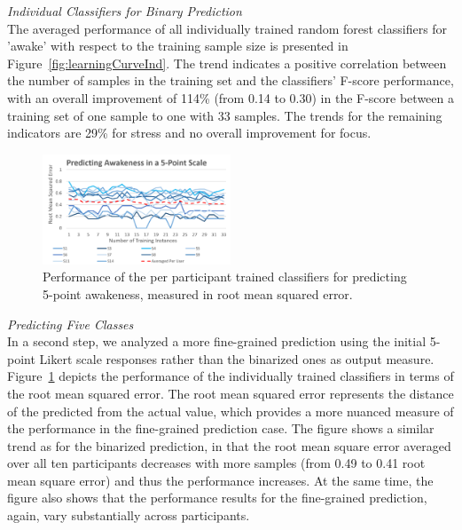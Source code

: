 \vspace{0.05in}
\noindent\textit{Individual Classifiers for Binary Prediction}\\
The averaged performance of all individually trained random forest classifiers for 'awake' with respect to the training sample size is presented in Figure~\ref{fig:learningCurveInd}. The trend indicates a positive correlation between the number of samples in the training set and the classifiers' F-score performance, with an overall improvement of  114\% (from 0.14 to 0.30) in the F-score between a training set of one sample to one with 33 samples. The trends for
the remaining indicators are 29\% for stress and no overall improvement for focus.\\[-0.1cm]


\begin{figure}
  \centering
      \includegraphics[width=0.5\textwidth]{20180914Awakeness5PointScaleOnly15Lines.png}
  \caption{Performance of the per participant trained classifiers for predicting 5-point awakeness, measured in root mean squared error.}
   \label{fig:learningCurve5}
\end{figure}

\noindent\textit{Predicting Five Classes}\\
In a second step, we analyzed a more fine-grained prediction using the initial 5-point Likert scale responses rather than the binarized ones as output measure. Figure~\ref{fig:learningCurve5} depicts the performance of the individually trained classifiers in terms of the root mean squared error. The root mean squared error represents the distance of the predicted from the actual value, which provides a more nuanced measure of the performance in the fine-grained prediction case. The figure shows a similar trend as for the binarized prediction, in that the root mean square error averaged over all ten participants decreases with more samples (from 0.49 to 0.41 root mean square error) and thus the performance increases. At the same time, the figure also shows that the performance results for the fine-grained prediction, again, vary substantially across participants.

